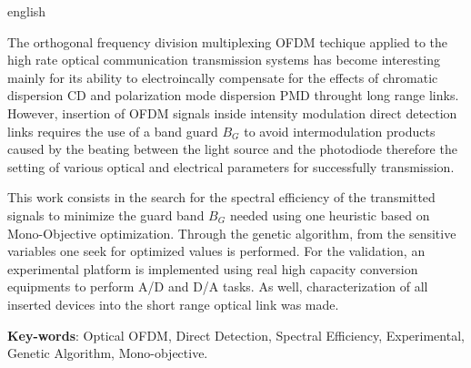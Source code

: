 \begin{resumo}[Abstract]
 \begin{otherlanguage*}{english}

The orthogonal frequency division multiplexing OFDM techique applied to the
high rate optical communication transmission systems has become interesting
mainly for its ability to electroincally compensate for the effects of
chromatic dispersion CD and polarization mode dispersion PMD throught long
range links. However, insertion of OFDM signals inside intensity modulation
direct detection links requires the use of a band guard $B_G$ to avoid
intermodulation products caused by the beating between the light source and the
photodiode therefore the setting of various optical and electrical parameters
for successfully transmission.

This work consists in the search for the spectral efficiency of the transmitted
signals to minimize the guard band $B_G$ needed using one heuristic based on
Mono-Objective optimization. Through the genetic algorithm, from the sensitive
variables one seek for optimized values is performed. For the validation, an
experimental platform is implemented using real high capacity conversion
equipments to perform A/D and D/A tasks. As well, characterization of all
inserted devices into the short range optical link was made.


\vspace{\onelineskip}
\noindent 
\textbf{Key-words}: Optical OFDM, Direct Detection, Spectral Efficiency,
Experimental, Genetic Algorithm, Mono-objective.
 \end{otherlanguage*}
\end{resumo}
